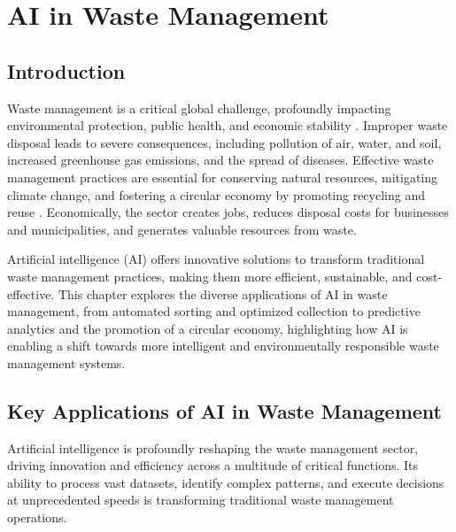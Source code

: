 \chapter{AI in Waste Management}
\label{cha:ai_in_waste_management}

\section{Introduction}

Waste management is a critical global challenge, profoundly impacting environmental protection, public health, and economic stability \cite{BartecMunicipal_Critical, BusinessWaste_Critical}. Improper waste disposal leads to severe consequences, including pollution of air, water, and soil, increased greenhouse gas emissions, and the spread of diseases. Effective waste management practices are essential for conserving natural resources, mitigating climate change, and fostering a circular economy by promoting recycling and reuse \cite{Prysmian_Critical, OGTEC_Critical}. Economically, the sector creates jobs, reduces disposal costs for businesses and municipalities, and generates valuable resources from waste.

Artificial intelligence (AI) offers innovative solutions to transform traditional waste management practices, making them more efficient, sustainable, and cost-effective. This chapter explores the diverse applications of AI in waste management, from automated sorting and optimized collection to predictive analytics and the promotion of a circular economy, highlighting how AI is enabling a shift towards more intelligent and environmentally responsible waste management systems.

\section{Key Applications of AI in Waste Management}

Artificial intelligence is profoundly reshaping the waste management sector, driving innovation and efficiency across a multitude of critical functions. Its ability to process vast datasets, identify complex patterns, and execute decisions at unprecedented speeds is transforming traditional waste management operations.

